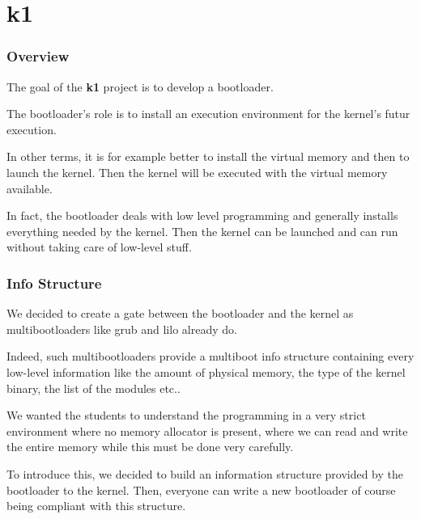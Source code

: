 %
%

\section{k1}


\begin{frame}
  \frametitle{Overview}

  The goal of the \textbf{k1} project is to develop a bootloader.

  \nl

  The bootloader's role is to install an execution environment for the
  kernel's futur execution.

  \nl

  In other terms, it is for example better to install the virtual memory
  and then to launch the kernel. Then the kernel will be executed with the
  virtual memory available.

  \nl

  In fact, the bootloader deals with low level programming and generally
  installs everything needed by the kernel. Then the kernel can be launched
  and can run without taking care of low-level stuff.
\end{frame}


\begin{frame}
  \frametitle{Info Structure}

  We decided to create a gate between the bootloader and the kernel as
  multibootloaders like grub and lilo already do.

  \nl

  Indeed, such multibootloaders provide a multiboot info structure containing
  every low-level information like the amount of physical memory, the type
  of the kernel binary, the list of the modules etc..

  \nl

  We wanted the students to understand the programming in a very strict
  environment where no memory allocator is present, where we can read and
  write the entire memory while this must be done very carefully.

  \nl

  To introduce this, we decided to build an information structure provided
  by the bootloader to the kernel. Then, everyone can write a new
  bootloader of course being compliant with this structure.
\end{frame}


